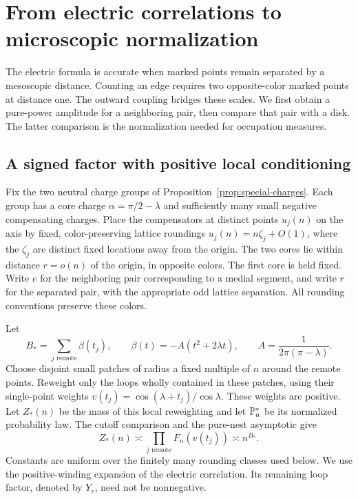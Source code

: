 \section{From electric correlations to microscopic normalization}
\label{sec:calibration}

The electric formula is accurate when marked points remain separated
by a mesoscopic distance. Counting an edge requires two opposite-color
marked points at distance one. The outward coupling bridges these
scales. We first obtain a pure-power amplitude for a neighboring pair,
then compare that pair with a disk. The latter comparison is the
normalization needed for occupation measures.

\subsection{A signed factor with positive local conditioning}

Fix the two neutral charge groups of
Proposition~\ref{prop:special-charges}. Each group has a core charge
$\alpha=\pi/2-\lambda$ and sufficiently many small negative
compensating charges. Place the compensators at distinct points
$u_j(n)$ on the axis by fixed, color-preserving lattice roundings
$u_j(n)=n\zeta_j+O(1)$, where the $\zeta_j$ are distinct fixed
locations away from the origin. The two cores lie within distance
$r=o(n)$ of the origin, in opposite colors. The first core is held
fixed. Write $e$ for the neighboring pair corresponding to a medial
segment, and write $r$ for the separated pair, with the appropriate
odd lattice separation. All rounding conventions preserve these
colors.

Let
\[
 B_* = \sum_{j\text{ remote}}\beta(t_j),\qquad
 \beta(t)=-A(t^2+2\lambda t),\qquad
 A=\frac{1}{2\pi(\pi-\lambda)}.
\]
Choose disjoint small patches of radius a fixed multiple of $n$ around
the remote points. Reweight only the loops wholly contained in these
patches, using their single-point weights
$v(t_j)=\cos(\lambda+t_j)/\cos\lambda$. These weights are positive.
Let $Z_*(n)$ be the mass of this local reweighting and let
$\mathbb P_n^*$ be its normalized probability law. The cutoff comparison
and the pure-nest asymptotic give
\begin{equation}\label{eq:proxy-mass}
 Z_*(n)\asymp\prod_{j\text{ remote}}F_n(v(t_j))
 \asymp n^{B_*}.
\end{equation}
Constants are uniform over the finitely many rounding classes used
below. We use the positive-winding expansion of the electric
correlation. Its remaining loop factor, denoted by $Y_r$, need not
be nonnegative.

